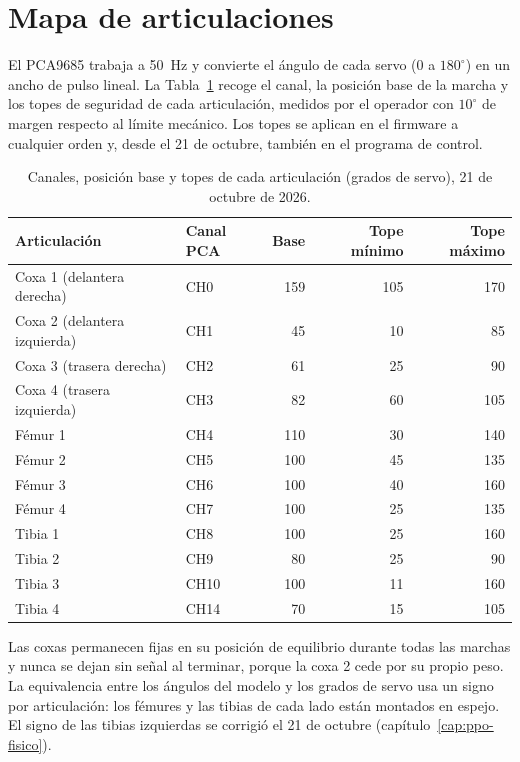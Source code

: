 \section{Mapa de articulaciones}

El PCA9685 trabaja a 50~Hz y convierte el ángulo de cada servo (0 a $180^\circ$)
en un ancho de pulso lineal. La Tabla~\ref{tab:mapa-articulaciones} recoge el
canal, la posición base de la marcha y los topes de seguridad de cada
articulación, medidos por el operador con $10^\circ$ de margen respecto al límite
mecánico. Los topes se aplican en el firmware a cualquier orden y, desde el 21
de octubre, también en el programa de control.

\begin{table}[H]
\centering
\caption{Canales, posición base y topes de cada articulación (grados de servo), 21 de octubre de 2026.}
\label{tab:mapa-articulaciones}
\small
\begin{tabular}{llrrr}
\toprule
Articulación & Canal PCA & Base & Tope mínimo & Tope máximo \\
\midrule
Coxa 1 (delantera derecha) & CH0 & 159 & 105 & 170 \\
Coxa 2 (delantera izquierda) & CH1 & 45 & 10 & 85 \\
Coxa 3 (trasera derecha) & CH2 & 61 & 25 & 90 \\
Coxa 4 (trasera izquierda) & CH3 & 82 & 60 & 105 \\
Fémur 1 & CH4 & 110 & 30 & 140 \\
Fémur 2 & CH5 & 100 & 45 & 135 \\
Fémur 3 & CH6 & 100 & 40 & 160 \\
Fémur 4 & CH7 & 100 & 25 & 135 \\
Tibia 1 & CH8 & 100 & 25 & 160 \\
Tibia 2 & CH9 & 80 & 25 & 90 \\
Tibia 3 & CH10 & 100 & 11 & 160 \\
Tibia 4 & CH14 & 70 & 15 & 105 \\
\bottomrule
\end{tabular}
\end{table}

Las coxas permanecen fijas en su posición de equilibrio durante todas las
marchas y nunca se dejan sin señal al terminar, porque la coxa 2 cede por su
propio peso. La equivalencia entre los ángulos del modelo y los grados de servo
usa un signo por articulación: los fémures y las tibias de cada lado están
montados en espejo. El signo de las tibias izquierdas se corrigió el 21 de
octubre (capítulo~\ref{cap:ppo-fisico}).

